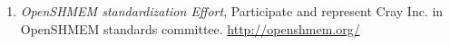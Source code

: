 \begin{enumerate}
\setcounter{enumi}{0}
\item \textit{OpenSHMEM standardization Effort}, Participate and represent Cray Inc. in
OpenSHMEM standards committee. \url{http://openshmem.org/}
\end{enumerate}
